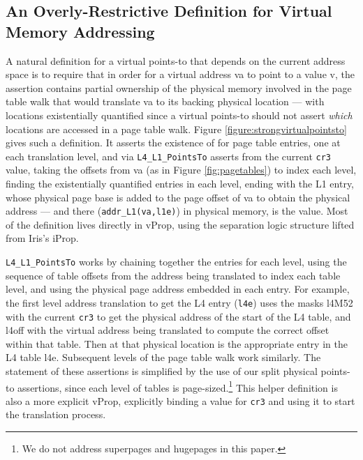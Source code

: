 \documentclass[acmsmall,screen,nonacm]{acmart}
\begin{document}
\subsection{An Overly-Restrictive Definition for Virtual Memory Addressing}
\label{sec:overly-restrictive}
A natural definition for a virtual points-to that depends on the current address space is to
require that in order for a virtual address \textsf{va} to point to a value \textsf{v}, the assertion contains
partial ownership of the physical memory involved in the page table walk that would translate \textsf{va} to
its backing physical location --- with locations existentially quantified since a virtual points-to should not assert
\emph{which} locations are accessed in a page table walk.
Figure \ref{figure:strongvirtualpointsto} gives such a definition.
It asserts the existence of for page table entries, one at each translation level, and via \lstinline|L4_L1_PointsTo|
asserts from the current \lstinline|cr3| value, taking the offsets from \textsf{va} (as in Figure \ref{fig:pagetables})
to index each level, finding the existentially quantified entries in each level, 
ending with the L1 entry, whose physical page base is added to the page offset of \textsf{va} to obtain the physical address
 --- and there (\lstinline|addr_L1(va,l1e)|) in physical memory, is the value.
Most of the definition lives directly in \textsf{vProp}, using the separation logic structure lifted from Iris's \textsf{iProp}.

\lstinline|L4_L1_PointsTo| works by
chaining together the entries for each level, using the sequence of table offsets from the address being translated to index
each table level, and using the physical page address embedded in each entry.
For example, 
  the first level address translation to get the L4 entry (\lstinline|l4e|) 
  uses the masks \textsf{l4M52} with the current \lstinline|cr3| to get the 
  physical address of the start of the L4 table,
  and \textsf{l4off} with the virtual address being translated to compute the correct offset within that table.
  Then at that physical location is the appropriate entry in the L4 table \textsf{l4e}.
  Subsequent levels of the page table walk work similarly.
The statement of these assertions is simplified by the use of our split physical points-to assertions, since
each level of tables is page-sized.\footnote{We do not address superpages and hugepages in this paper.}
This helper definition is also a more explicit \textsf{vProp}, explicitly binding a value for \lstinline|cr3| and using it
to start the translation process.
\end{document}
